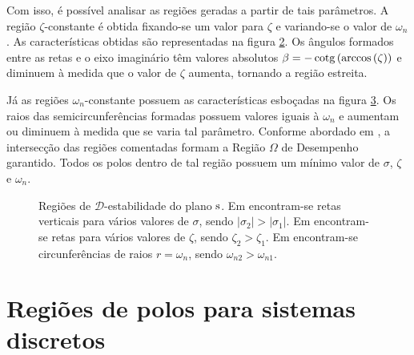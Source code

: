 Com isso, é possível analisar as regiões geradas a partir de tais parâmetros. A região $\zeta$-constante é obtida fixando-se um valor para $\zeta$ e variando-se o valor de $\omega_n$. As características obtidas são representadas na figura \ref{subfig:MaximoSobressinalS}. Os ângulos formados entre as retas e o eixo imaginário têm valores absolutos $\beta = -\operatorname{cotg}{\left(\arccos{\left(\zeta\right)}\right)}$ e diminuem à medida que o valor de $\zeta$ aumenta, tornando a região estreita.

Já as regiões $\omega_n$-constante possuem as características esboçadas na figura \ref{subfig:OscilacaoNaoAmortecidaS}. Os raios das semicircunferências formadas possuem valores iguais à $\omega_n$ e aumentam ou diminuem à medida que se varia tal parâmetro. Conforme abordado em , a intersecção das regiões comentadas formam a Região $\Omega$ de Desempenho garantido. Todos os polos dentro de tal região possuem um mínimo valor de $\sigma$, $\zeta$ e $\omega_n$.

\begin{figure}[!hb]
\centering
\begin{subfigure}[t]{0.3\columnwidth}

\caption{}
\label{subfig:EstabilidadeRelativaS}
\end{subfigure}
\begin{subfigure}[t]{0.3\columnwidth}

\caption{}
\label{subfig:MaximoSobressinalS}
\end{subfigure}
\begin{subfigure}[t]{0.35\columnwidth}

\caption{}
\label{subfig:OscilacaoNaoAmortecidaS}
\end{subfigure}
\caption{Regiões de $\mathscr{D}$-estabilidade do plano $\operatorname{\mathrm{s}}$. Em  encontram-se retas verticais para vários valores de $\sigma$, sendo $|\sigma_2| > |\sigma_1|$. Em  encontram-se retas para vários valores de $\zeta$, sendo $\zeta_2 > \zeta_1$. Em  encontram-se circunferências de raios $r = \omega_n$, sendo $\omega_{n2} > \omega_{n1}$.}
\label{fig:RegioesPlanoS}
\end{figure}

\section{Regiões de polos para sistemas discretos}\label{sec:DEstabilidadeZ}

